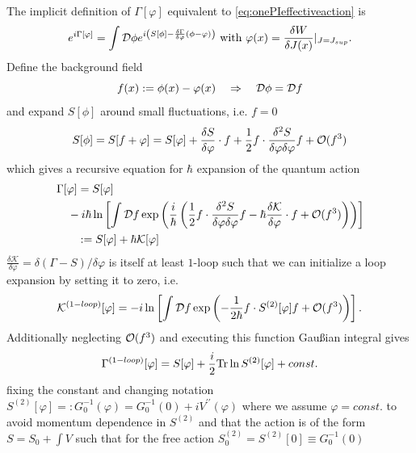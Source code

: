  \begin{mybox}{}
 	The implicit definition of $\Gamma[\varphi]$ equivalent to \ref{eq:onePIeffectiveaction} is
 	\begin{equation}
 	\label{eq:reference1}
 		e^{i\Gamma[\varphi]} = \int \mathcal{D} \phi e^{i\left(S[\phi] -\frac{\delta \Gamma}{\delta \varphi}(\phi-\varphi)\right)} \text{ with } \varphi(x)=\frac{\delta W}{\delta J(x)}|_{J=J_{sup}}.
 	\end{equation}
 	Define the background field
 	\begin{equation}
 		f(x):= \phi(x) - \varphi(x) \quad \Rightarrow\quad \mathcal{D} \phi = \mathcal{D} f
 	\end{equation}
 	and expand $S[\phi]$ around small fluctuations, i.e. $f=0$
 	\begin{equation}
 		S[\phi] = S[f+\varphi] =S[\varphi] + \frac{\delta S}{\delta \varphi} \cdot f+\frac{1}{2} f \cdot \frac{\delta^2 S}{\delta \varphi \delta \varphi} f + \mathcal{O}(f^3)
 	\end{equation}
 	which gives a recursive equation for $\hbar$ expansion of the quantum action
 	\begin{align}
 		\label{eq:onePIeffectiveactionRecurranceRelation}
 		\Gamma[\varphi] &= S[\varphi] \\
 		&\hspace{-0.3cm}- i\hbar \ln\left[\int \mD f \exp \left(\frac{i}{\hbar} \left(\half f \cdot \frac{\delta^2 S}{\delta \varphi\delta \varphi} f-\hbar \frac{\delta \mathcal{K}}{\delta \varphi} \cdot f+\mO(f^3)\right)\right)\right]\nonumber \\
 		&:= S[\varphi] + \hbar\mathcal{K}[\varphi]\nonumber
 	\end{align}
 	$\frac{\delta \mathcal{K}}{\delta \varphi}=\delta(\Gamma-S)/\delta \varphi$ is itself at least $1$-loop such that we can initialize a loop expansion by setting it to zero, i.e.
 	\begin{equation}
 	\label{eq:onePI1Loopcorrection}
 		\mathcal{K}^{(1-loop)}[\varphi] = -i \ln \left[ \int \mathcal{D} f \exp \left(- \frac{1}{2\hbar} f\cdot S^{(2)}[\varphi] f + \mathcal{O}(f^3)\right)\right].
 	\end{equation}
 	Additionally neglecting $\mathcal{O}(f^3)$ and executing this function Gaußian integral gives
 	\begin{equation}
 		\Gamma^{(1-loop)}[\varphi] = S[\varphi] + \frac{i}{2}\mathrm{Tr} \ln S^{(2)}[\varphi] + const.
 	\end{equation}
 	fixing the constant and changing notation $S^{(2)}[\varphi] =: G^{-1}_0(\varphi) = G^{-1}_0(0) + i V^{\prime \prime}(\varphi)$ where we assume $\varphi=const.$ to avoid momentum dependence in $S^{(2)}$ and that the action is of the form $S=S_0+\int V$ such that for the free action $S^{(2)}_0=S^{(2)}[0] \equiv G^{-1}_0(0)$

\end{mybox}

